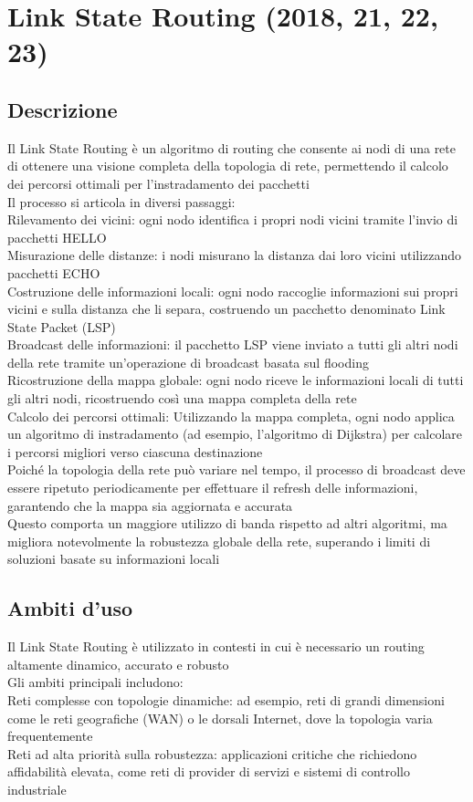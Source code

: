 \documentclass[10pt,oneside,a4paper]{article}
\begin{document}
\section{Link State Routing (2018, 21, 22, 23)}
\subsection{Descrizione}
Il Link State Routing è un algoritmo di routing che consente ai nodi di una rete di ottenere una visione completa della topologia di rete, permettendo il calcolo dei percorsi ottimali per l'instradamento dei pacchetti\\
Il processo si articola in diversi passaggi:\\
Rilevamento dei vicini: ogni nodo identifica i propri nodi vicini tramite l’invio di pacchetti HELLO\\
Misurazione delle distanze: i nodi misurano la distanza dai loro vicini utilizzando pacchetti ECHO\\
Costruzione delle informazioni locali: ogni nodo raccoglie informazioni sui propri vicini e sulla distanza che li separa, costruendo un pacchetto denominato Link State Packet (LSP)\\
Broadcast delle informazioni: il pacchetto LSP viene inviato a tutti gli altri nodi della rete tramite un’operazione di broadcast basata sul flooding\\
Ricostruzione della mappa globale: ogni nodo riceve le informazioni locali di tutti gli altri nodi, ricostruendo così una mappa completa della rete\\
Calcolo dei percorsi ottimali: Utilizzando la mappa completa, ogni nodo applica un algoritmo di instradamento (ad esempio, l’algoritmo di Dijkstra) per calcolare i percorsi migliori verso ciascuna destinazione\\
Poiché la topologia della rete può variare nel tempo, il processo di broadcast deve essere ripetuto periodicamente per effettuare il refresh delle informazioni, garantendo che la mappa sia aggiornata e accurata\\
Questo comporta un maggiore utilizzo di banda rispetto ad altri algoritmi, ma migliora notevolmente la robustezza globale della rete, superando i limiti di soluzioni basate su informazioni locali
\subsection{Ambiti d’uso}
Il Link State Routing è utilizzato in contesti in cui è necessario un routing altamente dinamico, accurato e robusto\\
Gli ambiti principali includono:\\
Reti complesse con topologie dinamiche: ad esempio, reti di grandi dimensioni come le reti geografiche (WAN) o le dorsali Internet, dove la topologia varia frequentemente\\
Reti ad alta priorità sulla robustezza: applicazioni critiche che richiedono affidabilità elevata, come reti di provider di servizi e sistemi di controllo industriale
\end{document}
